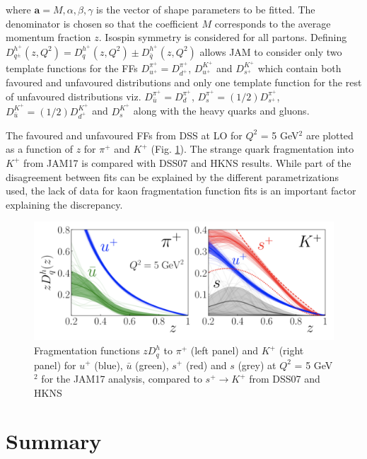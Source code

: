 where $\textbf{a} = {M,\alpha,\beta,\gamma}$ is the vector of shape parameters to be fitted. The denominator is chosen so that the coefficient $M$ corresponds to the average momentum fraction $z$. Isospin symmetry is considered for all partons. Defining $D^{h^{+}}_{q^{\pm}}(z,Q^2) = D^{h^{+}}_{q}(z,Q^2) \pm D^{h^{+}}_{\bar{q}}(z,Q^2)$ allows JAM to consider only two template functions for the FFs $D^{\pi^{+}}_{u^{+}} = D^{\pi^{+}}_{d^{+}}$, $D^{K^{+}}_{u^{+}}$ and $D^{K^{+}}_{s^{+}}$ which contain both favoured and unfavoured distributions and only one template function for the rest of unfavoured distributions viz. $D^{\pi^{+}}_{\bar{u}} = D^{\pi^{+}}_{d}$, $D^{\pi^{+}}_{s} = (1/2)D^{\pi^{+}}_{s^{+}}$, $D^{K^{+}}_{\bar{u}} = (1/2)D^{K^{+}}_{d^{+}}$ and $D^{K^{+}}_{s}$ along with the heavy quarks and gluons.

The favoured and unfavoured FFs from DSS at LO for $Q^2$ = 5 GeV$^2$ are plotted as a function of $z$ for $\pi^+$ and $K^+$ (Fig. \ref{pic:JAMcomp}). The strange quark fragmentation into $K^+$ from JAM17 is compared with DSS07 and HKNS results. While part of the disagreement between fits can be explained by the different parametrizations used, the lack of data for kaon fragmentation function fits is an important factor explaining the discrepancy.

\begin{figure}[!h]
  \centering
	\includegraphics[scale=0.5]{./gfx/JAMcomp.png}
	\caption{Fragmentation functions $zD^h_q$ to $\pi^+$ (left panel) and $K^+$ (right panel) for $u^+$ (blue), $\bar{u}$ (green), $s^+$ (red) and $s$ (grey) at $Q^2$ = 5 GeV$^2$ for the JAM17 analysis, compared to $s^+ \rightarrow K^+$ from DSS07 and HKNS}
	\label{pic:JAMcomp}
\end{figure}

\newpage

\section{Summary}

